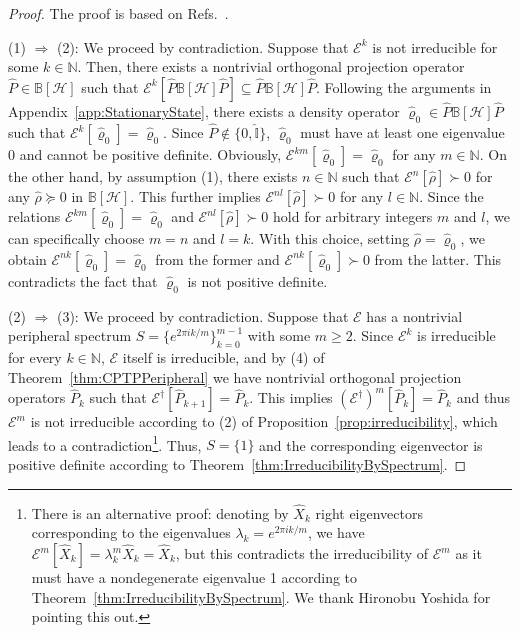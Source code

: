 \documentclass[preprint,pteplogo]{ptephy_v2}%
\numberwithin{equation}{section}
\theoremstyle{definition}
\newcommand{\mc}[1]{\mathcal{#1}}
\newcommand{\mbb}[1]{\mathbb{#1}}
\begin{document}
\begin{proof}
The proof is based on Refs.~\cite{evans1978spectral, wolf2012quantum}.

(1) $\Rightarrow$ (2): 
We proceed by contradiction. 
Suppose that $\mc{E}^k$ is not irreducible for some $k \in \mbb{N}$. 
Then, there exists a nontrivial orthogonal projection operator $\hat{P} \in \mbb{B}[\mc{H}]$ such that $\mc{E}^k[\hat{P} \mbb{B}[\mc{H}] \hat{P}] \subseteq \hat{P} \mbb{B}[\mc{H}] \hat{P}$. 
Following the arguments in Appendix~\ref{app:StationaryState}, there exists a density operator $\hat{\varrho}_0 \in \hat{P} \mbb{B}[\mc{H}] \hat{P}$ such that $\mc{E}^k[\hat{\varrho}_0] = \hat{\varrho}_0$. 
Since $\hat{P} \notin \{ 0, \hat{\mbb{I}} \}$, $\hat{\varrho}_0$ must have at least one eigenvalue $0$ and cannot be positive definite.
Obviously, $\mc{E}^{km}[\hat{\varrho}_0] = \hat{\varrho}_0$ for any $m \in \mbb{N}$.
On the other hand, by assumption (1), there exists $n \in \mbb{N}$ such that $\mc{E}^n[\hat{\rho}] \succ 0$ for any $\hat{\rho} \succeq 0$ in $\mbb{B}[\mc{H}]$.
This further implies $\mc{E}^{nl}[\hat{\rho}] \succ 0$ for any $l \in \mbb{N}$. 
Since the relations $\mc{E}^{km}[\hat{\varrho}_0] = \hat{\varrho}_0$ and $\mc{E}^{nl}[\hat{\rho}] \succ 0$ hold for arbitrary integers $m$ and $l$, we can specifically choose $m=n$ and $l=k$.
With this choice, setting $\hat{\rho} = \hat{\varrho}_0$, we obtain $\mc{E}^{nk}[\hat{\varrho}_0] = \hat{\varrho}_0$ from the former and $\mc{E}^{nk}[\hat{\varrho}_0] \succ 0$ from the latter. 
This contradicts the fact that $\hat{\varrho}_0$ is not positive definite.

(2) $\Rightarrow$ (3): 
We proceed by contradiction.
Suppose that $\mc{E}$ has a nontrivial peripheral spectrum $S = \{ e^{2\pi ik/m} \}_{k=0}^{m-1}$ with some $m \geq 2$.
Since $\mc{E}^k$ is irreducible for every $k \in \mbb{N}$, $\mc{E}$ itself is irreducible, and by (4) of Theorem~\ref{thm:CPTPPeripheral} we have nontrivial orthogonal projection operators $\hat{P}_k$ such that $\mc{E}^\dagger[\hat{P}_{k+1}] = \hat{P}_k$.
This implies $(\mc{E}^\dagger)^m [\hat{P}_k] = \hat{P}_k$ and thus $\mc{E}^m$ is not irreducible according to (2) of Proposition~\ref{prop:irreducibility}, which leads to a contradiction\footnote{
There is an alternative proof: denoting by $\hat{X}_k$ right eigenvectors corresponding to the eigenvalues $\lambda_k = e^{2\pi ik/m}$, we have $\mc{E}^m[\hat{X}_k] = \lambda_k^m \hat{X}_k = \hat{X}_k$, but this contradicts the irreducibility of $\mc{E}^m$ as it must have a nondegenerate eigenvalue 1 according to Theorem~\ref{thm:IrreducibilityBySpectrum}.
We thank Hironobu Yoshida for pointing this out.
}.
Thus, $S = \{ 1 \}$ and the corresponding eigenvector is positive definite according to Theorem~\ref{thm:IrreducibilityBySpectrum}.


\end{proof}
\end{document}

